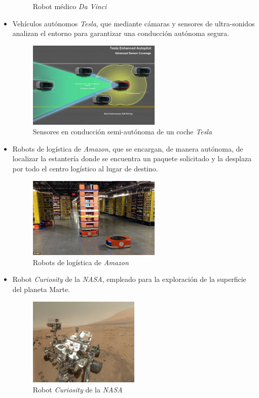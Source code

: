 \begin{itemize}
\begin{figure}[H]
    \caption{Robot médico \textit{Da Vinci}} \label{fig:davinci}
    \end{figure}
    \item Vehículos autónomos \textit{Tesla}, que mediante cámaras y sensores de ultra-sonidos analizan el entorno para garantizar una conducción autónoma segura. 
    \begin{figure}[H]
        \centering
        \includegraphics[width=0.6\textwidth]{img/teslaSensors.png}
        \caption{Sensores en conducción semi-autónoma de un coche \textit{Tesla}} \label{fig:tesla}
    \end{figure}
    
    \item Robots de logística de \textit{Amazon}, que se encargan, de manera autónoma, de localizar la estantería donde se encuentra un paquete solicitado y la desplaza por todo el centro logístico al lugar de destino. 
        \begin{figure}[H]
    \centering
    \includegraphics[width=0.6\textwidth]{img/robots-amazon.jpg}
    \caption{Robots de logística de \textit{Amazon} } \label{fig:amazon}
    \end{figure}
    \item Robot \textit{Curiosity} de la \textit{NASA}, empleado para la exploración de la superficie del planeta Marte. 
    \begin{figure}[H]
    \centering
    \includegraphics[width=0.5\textwidth]{img/curiosity.jpg}
    \caption{Robot \textit{Curiosity} de la \textit{NASA}} \label{fig:curiosity}
    \end{figure}
\end{itemize}{}

